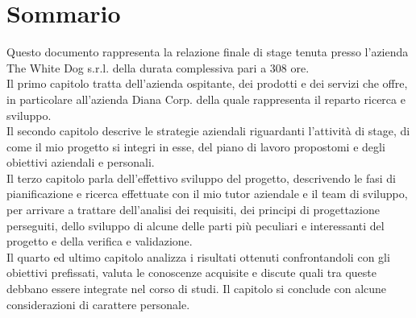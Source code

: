 \cleardoublepage
{}
{}
\begingroup
\let\clearpage\relax
\let\cleardoublepage\relax
\let\cleardoublepage\relax

\chapter*{Sommario}

Questo documento rappresenta la relazione finale di stage tenuta presso l'azienda The White Dog s.r.l. della durata complessiva pari a 308 ore. \\
Il primo capitolo tratta dell'azienda ospitante, dei prodotti e dei servizi che offre, in particolare all’azienda Diana Corp. della quale rappresenta il reparto ricerca e sviluppo. \\
Il secondo capitolo descrive le strategie aziendali riguardanti l’attività di stage, di come il mio progetto si integri in esse, del piano di lavoro propostomi e degli obiettivi aziendali e personali. \\
Il terzo capitolo parla dell'effettivo sviluppo del progetto, descrivendo le fasi di pianificazione e ricerca effettuate con il mio tutor aziendale e il team di sviluppo, per arrivare a trattare dell'analisi dei requisiti, dei principi di progettazione perseguiti, dello sviluppo di alcune delle parti più peculiari e interessanti del progetto e della verifica e validazione. \\
Il quarto ed ultimo capitolo analizza i risultati ottenuti confrontandoli con gli obiettivi prefissati, valuta le conoscenze acquisite e discute quali tra queste debbano essere integrate nel corso di studi. Il capitolo si conclude con alcune considerazioni di carattere personale.

%
%

\endgroup			


